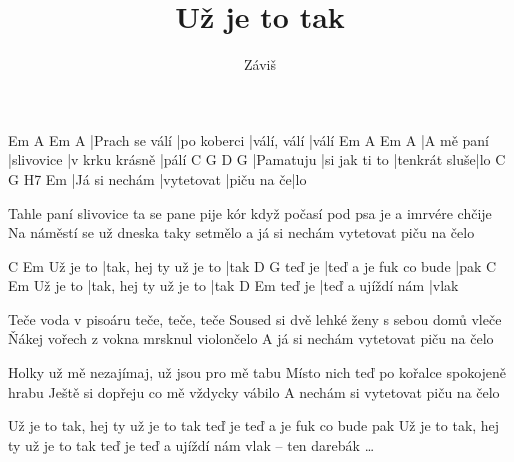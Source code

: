 \documentclass{song}
\title{Už je to tak}
\author{Záviš}
\begin{document}
\strophe
Em             A           Em          A
|Prach se válí |po koberci |válí, válí |válí
Em         A          Em             A
|A mě paní |slivovice |v krku krásně |pálí
C         G             D             G
|Pamatuju |si jak ti to |tenkrát sluše|lo
C             G          H7         Em
|Já si nechám |vytetovat |piču na če|lo
\endstrophe


\strophe*
Tahle paní slivovice ta se pane pije
kór když počasí pod psa je a imrvére chčije
Na náměstí se už dneska taky setmělo
a já si nechám vytetovat piču na čelo
\endstrophe

         C                     Em
Už je to |tak, hej ty už je to |tak
       D                     G
teď je |teď a je fuk co bude |pak
         C                     Em
Už je to |tak, hej ty už je to |tak
       D                 Em
teď je |teď a ujíždí nám |vlak
\endstrophe

\strophe*
Teče voda v pisoáru teče, teče, teče
Soused si dvě lehké ženy s sebou domů vleče
Ňákej vořech z vokna mrsknul violončelo
A já si nechám vytetovat piču na čelo
\endstrophe

\strophe*
Holky už mě nezajímaj, už jsou pro mě tabu
Místo nich teď po kořalce spokojeně hrabu
Ještě si dopřeju co mě vždycky vábilo
A nechám si vytetovat piču na čelo
\endstrophe

Už je to tak, hej ty už je to tak
teď je teď a je fuk co bude pak
Už je to tak, hej ty už je to tak
teď je teď a ujíždí nám vlak -- ten darebák \ldots
\endstrophe
\end{document}
